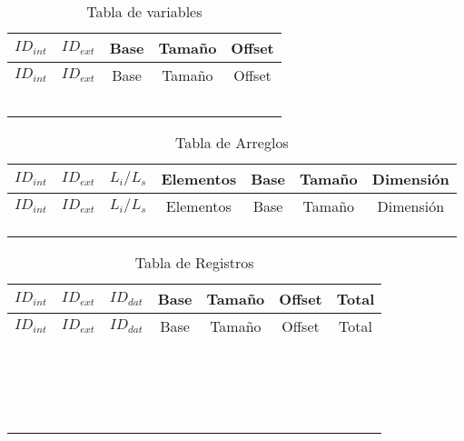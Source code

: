\documentclass{article}
\newcommand{\tabladeenumerados}[4]{
 \renewcommand{\tabcolsep}{0.3em}
 \begin{longtable}{|c|c|c|c|c|}
  \hline
  $ID_{int}$ & $ID_{ext}$ & $L_i/L_s$ & Base & Tamaño \\
  \hline
 \endfirsthead
  #1
  \hline
  $ID_{int}$ & $ID_{ext}$ & $L_i/L_s$ & Base & Tamaño \\
  \hline
 \endhead
  \hline
  #2
  \hline
 \caption{Tabla de Enumerados#3}
 \label{#4}
 \end{longtable}
}
\newcommand{\tabladearreglos}[4]{
 \renewcommand{\tabcolsep}{0.3em}
 \begin{longtable}{|c|c|c|c|c|c|c|}
  \hline
  $ID_{int}$ & $ID_{ext}$ & $L_i/L_s$ & Elementos & Base & Tamaño & Dimensión \\
  \hline
 \endfirsthead
  #1
  \hline
  $ID_{int}$ & $ID_{ext}$ & $L_i/L_s$ & Elementos & Base & Tamaño & Dimensión \\
  \hline
 \endhead
  \hline
  #2
  \hline
 \caption{Tabla de Arreglos#3}
 \label{#4}
 \end{longtable}
}
\newcommand{\tabladeregistros}[4]{
 \renewcommand{\tabcolsep}{0.3em}
 \begin{longtable}{|c|c|c|c|c|c|c|}
  \hline
  $ID_{int}$ & $ID_{ext}$ & $ID_{dat}$ & Base & Tamaño & Offset & Total \\
  \hline
 \endfirsthead
  #1
  \hline
  $ID_{int}$ & $ID_{ext}$ & $ID_{dat}$ & Base & Tamaño & Offset & Total \\
  \hline
 \endhead
  \hline
  #2
  \hline
 \caption{Tabla de Registros#3}
 \label{#4}
 \end{longtable}
}
\newcommand{\tabladevariables}[4]{
 \renewcommand{\tabcolsep}{0.3em}
 \begin{longtable}{|c|c|c|c|c|}
  \hline
  $ID_{int}$ & $ID_{ext}$ & Base & Tamaño & Offset \\
  \hline
 \endfirsthead
  #1
  \hline
  $ID_{int}$ & $ID_{ext}$ & Base & Tamaño & Offset \\
  \hline
 \endhead
  \hline
  #2
  \hline
 \caption{Tabla de variables#3}
 \label{#4}
 \end{longtable}
}
\begin{document}
\renewcommand{\arraystretch}{1}
{ \footnotesize
\tabladevariables{}{
&&&&\\
\hline
&&&&\\
\hline
&&&&\\
\hline
&&&&\\
}{}{}
\tabladearreglos{}{
&&&&&&\\
\hline
&&&&&&\\
}{}{}
\tabladeregistros{}{
&&&&&&\\
\cline{3-6}
&&&&&&\\
\cline{3-6}
&&&&&&\\
\cline{3-6}
&&&&&&\\
\cline{3-6}
&&&&&&\\
\cline{3-6}
&&&&&&\\
\cline{3-6}
&&&&&&\\
\cline{3-6}
&&&&&&\\
\cline{3-6}
&&&&&&\\
\cline{3-6}
&&&&&&\\
\cline{3-6}
&&&&&&\\
\cline{3-6}
&&&&&&\\
\cline{3-6}
&&&&&&\\
\cline{3-6}
&&&&&&\\
\cline{3-6}
&&&&&&\\
\cline{3-6}
&&&&&&\\
}{}{}
}
\end{document}
